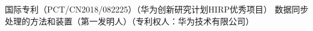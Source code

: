 \cvpub
{国际专利（PCT/CN2018/082225）（华为创新研究计划HIRP优秀项目）} %
{数据同步处理的方法和装置（第一发明人）（专利权人：华为技术有限公司）} %
{} %
{} %
{ %
}

